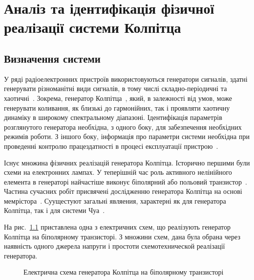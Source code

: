 \chapter{Аналіз та ідентифікація фізичної реалізації системи Колпітца}
\label{atu:ch:colpreal}


\section{Визначення системи}%
\label{atu:s:colp_task}


У ряді радіоелектронних пристроїв використовуються генератори
сигналів, здатні генерувати різноманітні види сигналів, в тому
числі складно-періодичні та хаотичні~\cite{dmitriev_gen_chaos}. Зокрема,
генератор Колпітца~\cite{kennedy_chaos_colpitts,atu_asau21,Kennedy_Colpitts_predicting}, який,
в залежності від умов, може генерувати коливання, як близькі
до гармонійних, так і проявляти хаотичну динаміку в широкому
спектральному діапазоні. Ідентифікація параметрів розглянутого
генератора необхідна, з одного боку, для забезпечення необхідних
режимів роботи. З іншого боку, інформація про параметри системи
необхідна при проведенні контролю працездатності в процесі
експлуатації пристрою~\cite{atu_apir2013}.

Існує множина фізичних реалізацій генератора Колпітца. Історично
першими були схеми на електронних лампах. У теперішній час роль
активного нелінійного елемента в генераторі найчастіше виконує
біполярний або польовий транзистор~\cite{doi:10.1063/1.4705999}. Частина
сучасних робіт присвячені дослідженню генератора Колпітца на
основі мемрістора~\cite{DBLP:journals/corr/WangWQ15}. Суущестуют загальні
являения, характерні як для генератора Колпітца, так і для
системи Чуа~\cite{Kennedy_Colpitts_Chua}.


На рис.~\ref{atu:f:colp_schem} приставлена одна з електричних схем,
що реалізують генератор Колпітца на біполярному транзисторі. З
множини схем, дана була обрана через наявність одного джерела
напруги і простоти схемотехнической реалізації генератора.


\begin{figure}[htb!]
\begin{center}

\end{center}
\caption{Електрична схема генератора Колпітца на біполярному транзисторі}
\label{atu:f:colp_schem}
\end{figure}

